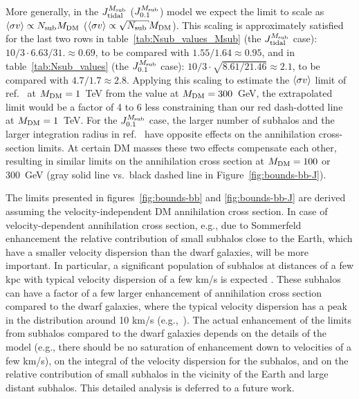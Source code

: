More generally, in the $J_{\rm tidal}^{M_{\rm sub}}$ ($J_{0.1}^{M_{\rm sub}}$) model we expect the limit to scale as
$\langle \sigma v \rangle \propto N_{\rm sub} M_{\rm DM}$ ($\sigmav \propto \sqrt{N_{\rm sub}} M_{\rm DM}$).
This scaling is approximately satisfied for the last two rows in table~\ref{tab:Nsub_values_Msub} (the $J_{\rm tidal}^{M_{\rm sub}}$ case):
$10/3 \cdot {6.63/31.} \approx 0.69$,
to be compared with $1.55/1.64 \approx 0.95$,
and in table~\ref{tab:Nsub_values} (the $J_{0.1}^{M_{\rm sub}}$ case):
$10/3 \cdot \sqrt{8.61/21.46} \approx 2.1$,
to be compared with $4.7/1.7 \approx 2.8$.
Applying this scaling to estimate the $\langle \sigma v \rangle$ limit of ref.~\cite{2023JCAP...07..033B} at $M_{\rm DM} = 1$~TeV from the value at $M_{\rm DM} = 300$~GeV, the extrapolated limit would be a factor of 4 to 6 less constraining than our red dash-dotted line at $M_{\rm DM} = 1$~TeV.
For the $J_{0.1}^{M_{\rm sub}}$ case, the larger number of subhalos and the larger integration radius in ref.~\cite{2023JCAP...07..033B}
have opposite effects on the annihilation cross-section limits.
At certain DM masses these two effects compensate each other, resulting in similar limits on the annihilation cross section
at $M_{\rm DM} = 100$ or 300~GeV (gray solid line vs.\ black dashed line in Figure~\ref{fig:bounds-bb-J}).



The limits presented in figures~\ref{fig:bounds-bb} and \ref{fig:bounds-bb-J} are derived assuming the velocity-independent DM annihilation cross section.
In case of velocity-dependent annihilation cross section, e.g., due to Sommerfeld enhancement \cite{ArkaniHamed:2008qn, Piccirillo:2022qet, Lacroix:2022cjm, Facchinetti:2022jtd}
the relative contribution of small subhalos close to the Earth, which have a smaller velocity dispersion than the dwarf galaxies, will be more important.
In particular, a significant population of subhalos at distances of a few kpc with typical velocity dispersion of a few km/s is expected \cite{2024MNRAS.530.2496A}.
These subhalos can have a factor of a few larger enhancement of annihilation cross section compared to the dwarf galaxies, where the typical velocity dispersion has a peak in the distribution around 10 km/s (e.g.,~\cite{2018JCAP...04..035L}).
The actual enhancement of the limits from subhalos compared to the dwarf galaxies depends on the details of the model (e.g., there should be no saturation of enhancement down to velocities of a few km/s), on the integral of the velocity dispersion for the subhalos, and on the relative contribution of small subhalos in the vicinity of the Earth and large distant subhalos.
This detailed analysis is deferred to a future work.
